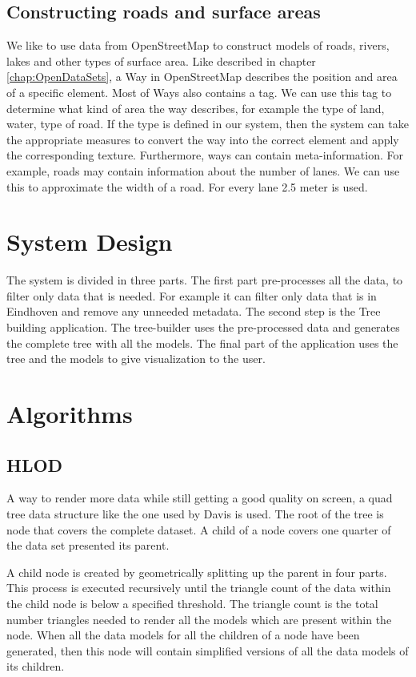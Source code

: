 \subsection{Constructing roads and surface areas}
We like to use data from OpenStreetMap to construct models of roads, rivers, lakes and other types of surface area. Like described in chapter \ref{chap:OpenDataSets}, a Way in OpenStreetMap describes the position and area of a specific element. Most of Ways also contains a tag. We can use this tag to determine what kind of area the way describes, for example the type of land, water, type of road. If the type is defined in our system, then the system can take the appropriate measures to convert the way into the correct element and apply the corresponding texture. Furthermore, ways can contain meta-information. For example, roads may contain information about the number of lanes. We can use this to approximate the width of a road. For every lane 2.5 meter is used.

\section{System Design}
\label{sec:SystemDesign}
The system is divided in three parts. The first part pre-processes all the data, to filter only data that is needed. For example it can filter only data that is in Eindhoven and remove any unneeded metadata. The second step is the Tree building application. The tree-builder uses the pre-processed data and generates the complete tree with all the models. The final part of the application uses the tree and the models to give visualization to the user.

\section{Algorithms}
\label{sec:Algorithms}
\subsection{HLOD}
\label{subsec:HLOD}
A way to render more data while still getting a good quality on screen, a quad tree data structure like the one used by Davis \cite{Davis} is used. The root of the tree is node that covers the complete dataset. A child of a node covers one quarter of the data set presented its parent.

A child node is created by geometrically splitting up the parent in four parts. This process is executed recursively until the triangle count of the data within the child node is below a specified threshold. The triangle count is the total number triangles needed to render all the models which are present within the node. When all the data models for all the children of a node have been generated, then this node will contain simplified versions of all the data models of its children.


